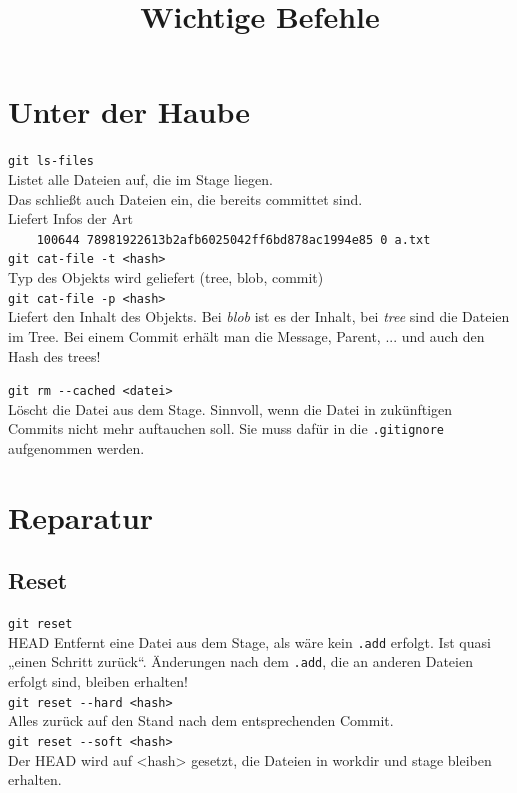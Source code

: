\documentclass[oneside]{scrreprt}
\title{Wichtige Befehle}
\begin{document}
\section*{Unter der Haube}

\verb+git ls-files+ \\
Listet alle Dateien auf, die im Stage liegen. \\
Das schließt auch Dateien ein, die bereits committet sind. \\ 
Liefert Infos der Art\\
\verb+    100644 78981922613b2afb6025042ff6bd878ac1994e85 0	a.txt+
~\\ 
 
 
\verb+git cat-file -t <hash>+\\
Typ des Objekts wird geliefert (tree, blob, commit)
~\\

\verb+git cat-file -p <hash>+\\
Liefert den Inhalt des Objekts. Bei \emph{blob} ist es der Inhalt, bei \emph{tree} sind die Dateien im Tree.
Bei einem Commit erhält man die Message, Parent, ... und auch den Hash des trees! 

 
\verb+git rm --cached <datei>+\\
Löscht die Datei aus dem Stage. Sinnvoll, wenn die Datei in
zukünftigen Commits nicht mehr auftauchen soll. Sie muss dafür 
in die \verb+.gitignore+ aufgenommen werden.
~\\

\section*{Reparatur}
\subsection*{Reset}
\verb+git reset+\\
HEAD Entfernt eine Datei aus dem Stage, als wäre kein \verb+.add+ erfolgt. Ist quasi „einen Schritt zurück“.
Änderungen nach dem \verb+.add+, die an anderen Dateien erfolgt sind, bleiben erhalten!
~\\

\verb+git reset --hard <hash>+\\
Alles zurück auf den Stand nach dem entsprechenden Commit.
~\\

\verb+git reset --soft <hash>+\\
Der HEAD wird auf <hash> gesetzt, die Dateien in workdir und stage bleiben erhalten.
~\\
\end{document}
